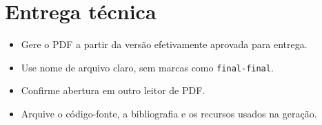 \section{Entrega técnica}

\begin{itemize}[label=$\square$]
  \item Gere o PDF a partir da versão efetivamente aprovada para entrega.
  \item Use nome de arquivo claro, sem marcas como \texttt{final-final}.
  \item Confirme abertura em outro leitor de PDF.
  \item Arquive o código-fonte, a bibliografia e os recursos usados na geração.
\end{itemize}
